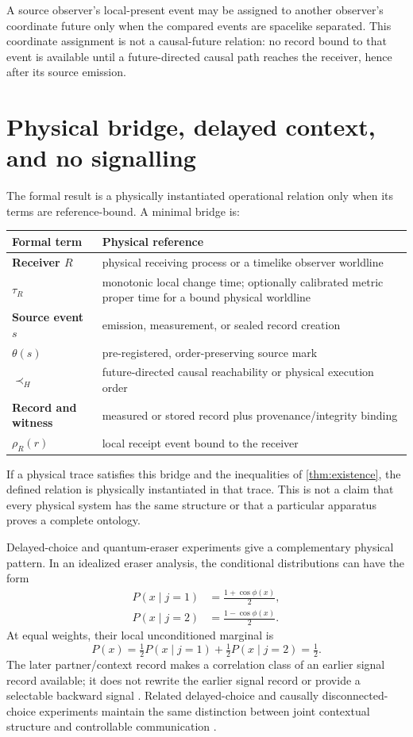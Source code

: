 \documentclass[11pt]{article}
\theoremstyle{remark}
\newcommand{\host}{\prec_{\!H}}
\begin{document}
A source observer's local-present event may be assigned to another observer's
coordinate future only when the compared events are spacelike separated.  This
coordinate assignment is not a causal-future relation: no record bound to that
event is available until a future-directed causal path reaches the receiver,
hence after its source emission.

\section{Physical bridge, delayed context, and no signalling}
\label{sec:physical}

The formal result is a physically instantiated operational relation only
when its terms are reference-bound.  A minimal bridge is:

\begin{center}
\begin{tabularx}{\textwidth}{>{\bfseries}p{}X}
\toprule
Formal term & Physical reference \\
\midrule
Receiver $R$ & physical receiving process or a timelike observer worldline \\
$\tau_R$ & monotonic local change time; optionally calibrated metric proper
time for a bound physical worldline \\
Source event $s$ & emission, measurement, or sealed record creation \\
$\theta(s)$ & pre-registered, order-preserving source mark \\
$\host$ & future-directed causal reachability or physical execution order \\
Record and witness & measured or stored record plus provenance/integrity binding \\
$\rho_R(r)$ & local receipt event bound to the receiver \\
\bottomrule
\end{tabularx}
\end{center}

If a physical trace satisfies this bridge and the inequalities of
\cref{thm:existence}, the defined relation is physically instantiated in that
trace.  This is not a claim that every physical system has the same structure
or that a particular apparatus proves a complete ontology.

Delayed-choice and quantum-eraser experiments give a complementary physical
pattern.  In an idealized eraser analysis, the conditional distributions can
have the form
\begin{align}
  P(x\mid j=1)&=\frac{1+\cos\phi(x)}{2},\\
  P(x\mid j=2)&=\frac{1-\cos\phi(x)}{2}.
\end{align}
At equal weights, their local unconditioned marginal is
\[
  P(x)=\tfrac12P(x\mid j=1)+\tfrac12P(x\mid j=2)=\tfrac12.
\]
The later partner/context record makes a correlation class of an earlier
signal record available; it does not rewrite the earlier signal record or
provide a selectable backward signal \cite{ScullyDruehl1982,Kim2000,Jordan1983}.
Related delayed-choice and causally disconnected-choice experiments maintain
the same distinction between joint contextual structure and controllable
communication \cite{Jacques2007,Ma2012,Ma2013}.
\end{document}
